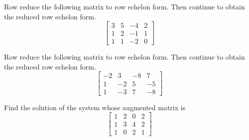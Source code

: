 \documentclass{ximera}
\begin{document}
\begin{problem}\label{prb:2.23} Row reduce the following matrix to row echelon form. Then continue to obtain the reduced row echelon form.
\begin{equation*}
\left[
\begin{array}{rrrr}
3 & 5 & -4 & 2 \\
1 & 2 & -1 & 1 \\
1 & 1 & -2 & 0
\end{array}
\right]
\end{equation*}
\end{problem}

\begin{problem}\label{prb:2.24} Row reduce the following matrix to row echelon form. Then continue to obtain the reduced row echelon form.
\begin{equation*}
\left[
\begin{array}{rrrr}
-2 & 3 & -8 & 7 \\
1 & -2 & 5 & -5 \\
1 & -3 & 7 & -8
\end{array}
\right]
\end{equation*}
\end{problem}

\begin{problem}\label{prb:2.25} Find the solution of the system whose augmented matrix is
\begin{equation*}
\left[
\begin{array}{rrr|r}
1 & 2 & 0 & 2 \\
1 & 3 & 4 & 2 \\
1 & 0 & 2 & 1
\end{array}
\right]
\end{equation*}
\end{problem}
\end{document}
